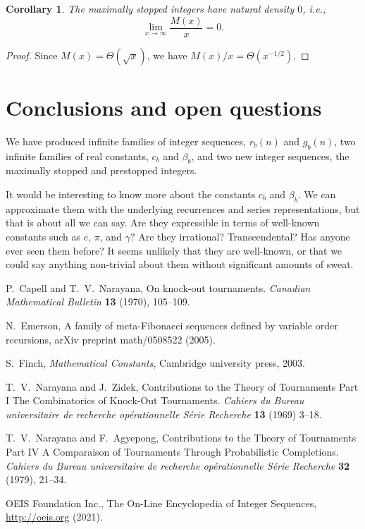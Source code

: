 \documentclass[12pt]{article}
\newtheorem{corollary}{Corollary}
\theoremstyle{definition}
\begin{document}
\begin{corollary}
    The maximally stopped integers have natural density $0$, i.e.,
    \begin{equation*}
        \lim_{x \to \infty} \frac{M(x)}{x} = 0.
    \end{equation*}
\end{corollary}

\begin{proof}
    Since $M(x) = \Theta(\sqrt{x})$, we have $M(x) / x = \Theta(x^{-1/2})$.
\end{proof}

\section{Conclusions and open questions}
\label{sec:conclusion}

We have produced infinite families of integer sequences, $r_b(n)$ and $g_b(n)$,
two infinite families of real constants, $c_b$ and $\beta_b$, and two new
integer sequences, the maximally stopped and prestopped integers.

It would be interesting to know more about the constants $c_b$ and $\beta_b$.
We can approximate them with the underlying recurrences and series
representations, but that is about all we can say. Are they expressible in
terms of well-known constants such as $e$, $\pi$, and $\gamma$? Are they
irrational? Transcendental? Has anyone ever seen them before? It seems unlikely
that they are well-known, or that we could say anything non-trivial about them
without significant amounts of sweat.

\begin{thebibliography}{1}

P.~Capell and T.~V.~Narayana, On knock-out tournaments. \emph{Canadian
Mathematical Bulletin} \textbf{13} (1970), 105--109.

N.~Emerson, A family of meta-Fibonacci sequences defined by variable order
recursions, arXiv preprint math/0508522 (2005).

S.~Finch, \emph{Mathematical Constants}, Cambridge university press, 2003.

T.~V.~Narayana and J.~Zidek, Contributions to the Theory of Tournaments Part I
The Combinatorics of Knock-Out Tournaments. \emph{Cahiers du Bureau
universitaire de recherche op\'erationnelle S\'erie Recherche} \textbf{13}
(1969) 3--18.

T.~V.~Narayana and F.~Agyepong, Contributions to the Theory of Tournaments Part
IV A Comparaison of Tournaments Through Probabilistic Completions.
\emph{Cahiers du Bureau universitaire de recherche op\'erationnelle S\'erie
Recherche} \textbf{32} (1979), 21--34.

OEIS Foundation Inc., The On-Line Encyclopedia of Integer Sequences,
\url{http://oeis.org} (2021).

\end{thebibliography}
\end{document}
